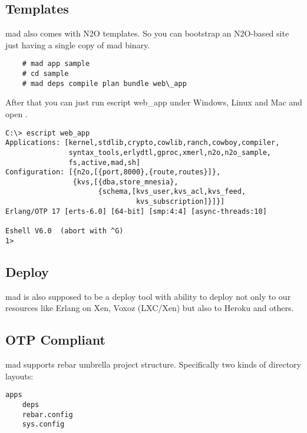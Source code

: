 \subsection{Templates}

mad also comes with N2O templates. So you can bootstrap an N2O-based site
just having a single copy of mad binary.

\vspace{1\baselineskip}
\begin{lstlisting}
    # mad app sample
    # cd sample
    # mad deps compile plan bundle web\_app
\end{lstlisting}
\vspace{1\baselineskip}

After that you can just run escript web\_app under Windows, Linux and
Mac and open .

\vspace{1\baselineskip}
\begin{lstlisting}
C:\> escript web_app
Applications: [kernel,stdlib,crypto,cowlib,ranch,cowboy,compiler,
               syntax_tools,erlydtl,gproc,xmerl,n2o,n2o_sample,
               fs,active,mad,sh]
Configuration: [{n2o,[{port,8000},{route,routes}]},
                {kvs,[{dba,store_mnesia},
                      {schema,[kvs_user,kvs_acl,kvs_feed,
                               kvs_subscription]}]}]
Erlang/OTP 17 [erts-6.0] [64-bit] [smp:4:4] [async-threads:10]

Eshell V6.0  (abort with ^G)
1>
\end{lstlisting}
\vspace{1\baselineskip}

\subsection{Deploy}

mad is also supposed to be a deploy tool with ability to
deploy not only to our resources like Erlang on Xen, Voxoz (LXC/Xen) but
also to Heroku and others.

\subsection{OTP Compliant}

mad supports rebar umbrella project structure.
Specifically two kinds of directory layouts:

\begin{lstlisting}[caption=Solution]
    apps
    deps
    rebar.config
    sys.config
\end{lstlisting}

